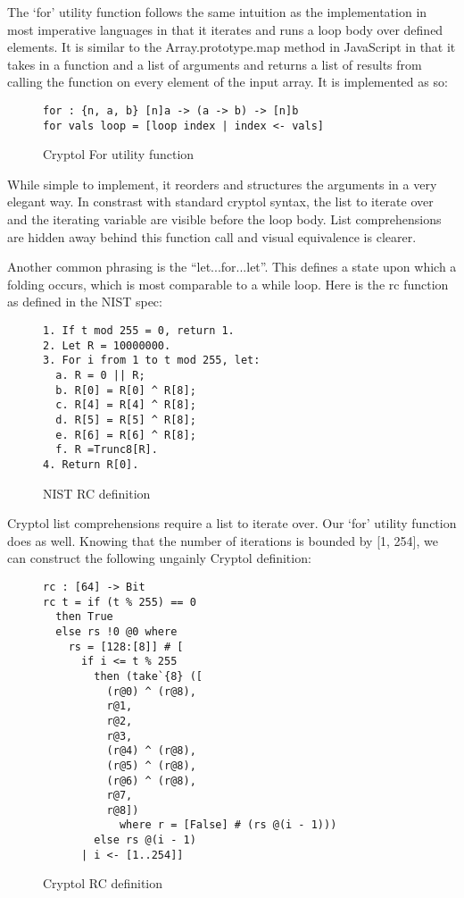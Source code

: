 The ‘for’ utility function follows the same intuition as the implementation in most 
imperative languages in that it iterates and runs a loop body over defined elements. 
It is similar to the Array.prototype.map method in JavaScript in that it takes in a 
function and a list of arguments and returns a list of results from calling the function 
on every element of the input array. It is implemented as so:

\begin{figure}[h]
  \centering
\begin{verbatim}
for : {n, a, b} [n]a -> (a -> b) -> [n]b
for vals loop = [loop index | index <- vals]
\end{verbatim}
\caption{Cryptol For utility function}
\label{fig:cryptolFor}
\end{figure}

While simple to implement, it reorders and structures the arguments in a very elegant way.
In constrast with standard cryptol syntax, the list to iterate over and the iterating 
variable are visible before the loop body. List comprehensions are hidden away behind this 
function call and visual equivalence is clearer.

Another common phrasing is the “let...for...let”. This defines a state upon which a folding 
occurs, which is most comparable to a while loop. Here is the rc function as defined in the 
NIST spec:

\begin{figure}[h]
  \centering
\begin{verbatim}
1. If t mod 255 = 0, return 1.
2. Let R = 10000000.
3. For i from 1 to t mod 255, let:
  a. R = 0 || R;
  b. R[0] = R[0] ^ R[8];
  c. R[4] = R[4] ^ R[8];
  d. R[5] = R[5] ^ R[8];
  e. R[6] = R[6] ^ R[8];
  f. R =Trunc8[R].
4. Return R[0].
\end{verbatim}
\caption{NIST RC definition}
\label{fig:nistRC}
\end{figure}

Cryptol list comprehensions require a list to iterate over. Our ‘for’ utility function does 
as well. Knowing that the number of iterations is bounded by [1, 254], we can construct the 
following ungainly Cryptol definition:

\begin{figure}[h]
  \centering
\begin{verbatim}
rc : [64] -> Bit
rc t = if (t % 255) == 0 
  then True 
  else rs !0 @0 where
    rs = [128:[8]] # [
      if i <= t % 255
        then (take`{8} ([
          (r@0) ^ (r@8),
          r@1,
          r@2,
          r@3, 
          (r@4) ^ (r@8),
          (r@5) ^ (r@8),
          (r@6) ^ (r@8),
          r@7,
          r@8])
            where r = [False] # (rs @(i - 1)))
        else rs @(i - 1)
      | i <- [1..254]]
\end{verbatim}
\caption{Cryptol RC definition}
\label{fig:cryptolRC}
\end{figure}

